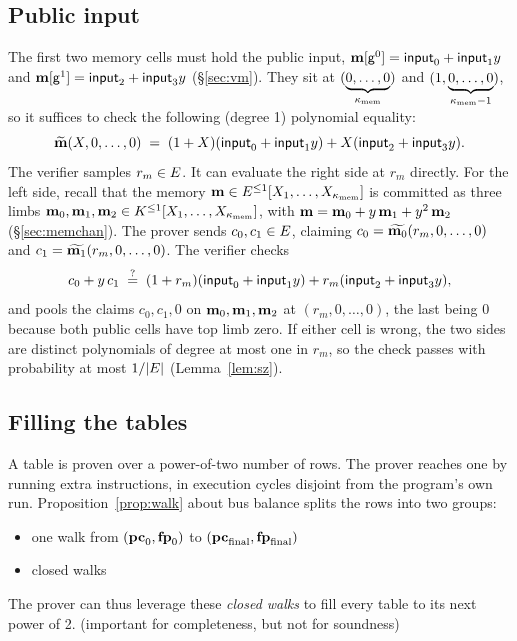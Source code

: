 \subsection{Public input}\label{sec:e2e-pi}

The first two memory cells must hold the public input, $\mathbf{m}[\mathsf{g}^{0}]=\textsf{input}_0+\textsf{input}_1y$ and $\mathbf{m}[\mathsf{g}^{1}]=\textsf{input}_2+\textsf{input}_3y$ (\S\ref{sec:vm}). They sit at $(\underbrace{0,\dots,0}_{\kappa_{\mathrm{mem}}})$ and $(1,\underbrace{0,\dots,0}_{\kappa_{\mathrm{mem}}-1})$, so it suffices to check the following (degree 1) polynomial equality:
\[
  \widetilde{\mathbf{m}}(X,0,\dots,0)\;=\;(1+X)(\textsf{input}_0+\textsf{input}_1y)+X(\textsf{input}_2+\textsf{input}_3y).
\]
The verifier samples $r_m\in E$. It can evaluate the right side at $r_m$ directly. For the left side, recall that the memory $\mathbf{m}\in E^{\le1}[X_1,\dots,X_{\kappa_{\mathrm{mem}}}]$ is committed as three limbs $\mathbf{m}_0,\mathbf{m}_1,\mathbf{m}_2\in K^{\le1}[X_1,\dots,X_{\kappa_{\mathrm{mem}}}]$, with $\mathbf{m}=\mathbf{m}_0+y\,\mathbf{m}_1+y^2\,\mathbf{m}_2$ (\S\ref{sec:memchan}). The prover sends $c_0,c_1\in E$, claiming $c_0=\widetilde{\mathbf{m}_0}(r_m,0,\dots,0)$ and $c_1=\widetilde{\mathbf{m}_1}(r_m,0,\dots,0)$. The verifier checks
\[
  c_0+y\,c_1\;\stackrel{?}{=}\;(1+r_m)(\textsf{input}_0+\textsf{input}_1y)+r_m(\textsf{input}_2+\textsf{input}_3y),
\]
and pools the claims $c_0,c_1,0$ on $\mathbf{m}_0,\mathbf{m}_1,\mathbf{m}_2$ at $(r_m,0,\dots,0)$, the last being $0$ because both public cells have top limb zero. If either cell is wrong, the two sides are distinct polynomials of degree at most one in $r_m$, so the check passes with probability at most $1/|E|$ (Lemma~\ref{lem:sz}).

\subsection{Filling the tables}\label{sec:e2e-pad}

A table is proven over a power-of-two number of rows. The prover reaches one by running extra instructions, in execution cycles disjoint from the program's own run. Proposition~\ref{prop:walk} about bus balance splits the rows into two groups:
\begin{itemize}
\item one walk from $(\mathbf{pc}_0,\mathbf{fp}_0)$ to $(\mathbf{pc}_{\mathrm{final}},\mathbf{fp}_{\mathrm{final}})$
\item closed walks
\end{itemize}
The prover can thus leverage these \emph{closed walks} to fill every table to its next power of 2. (important for completeness, but not for soundness)

